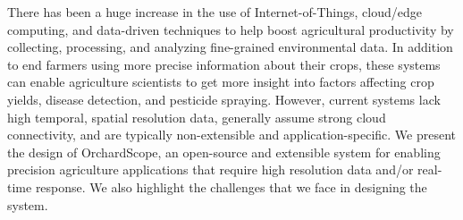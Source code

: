 There has been a huge increase in the use of Internet-of-Things, cloud/edge computing, and data-driven techniques to help boost agricultural productivity by collecting, processing, and analyzing fine-grained environmental data. 
In addition to end farmers using more precise information about their crops, these systems can enable agriculture scientists to get more insight into factors affecting crop yields, disease detection, and pesticide spraying. 
However, current systems lack high temporal, spatial resolution data, generally assume strong cloud connectivity, and are typically non-extensible and application-specific. 
We present the design of OrchardScope, an open-source and extensible system for enabling precision agriculture applications that require high resolution data and/or real-time response. 
We also highlight the challenges that we face in designing the system. 

